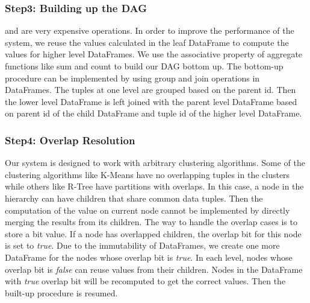 \subsubsection{Step3: Building up the DAG}
{\aggravation} and {\intervention} are very expensive operations. 
In order to improve the performance of the system, we reuse the values calculated in the leaf DataFrame to compute the values for higher level DataFrames. 
We use the associative property of aggregate functions like sum and count to build our DAG bottom up. 
The bottom-up procedure can be implemented by using group and join operations in DataFrames. 
The tuples at one level are grouped based on the parent id.  
Then the lower level DataFrame is left joined with the parent level DataFrame based on parent id of the child DataFrame and tuple id of the higher level DataFrame. 

\subsubsection{Step4: Overlap Resolution}
Our system is designed to work with arbitrary clustering algorithms. 
Some of the clustering algorithms like K-Means have no overlapping tuples in the clusters while others like R-Tree have partitions with overlaps. 
In this case, a node in the hierarchy can have children that share common data tuples. 
Then the computation of the value on current node cannot be implemented by directly merging the results from its children. 
The way to handle the overlap cases is to store a bit value.
If a node has overlapped children, the overlap bit for this node is set to \emph{true}. 
Due to the immutability of DataFrames, we create one more DataFrame for the nodes whose overlap bit is \emph{true}. 
In each level, nodes whose overlap bit is \emph{false} can reuse values from their children. Nodes in the DataFrame with \emph{true} overlap bit will be recomputed to get the correct values. 
Then the built-up procedure is resumed. 

